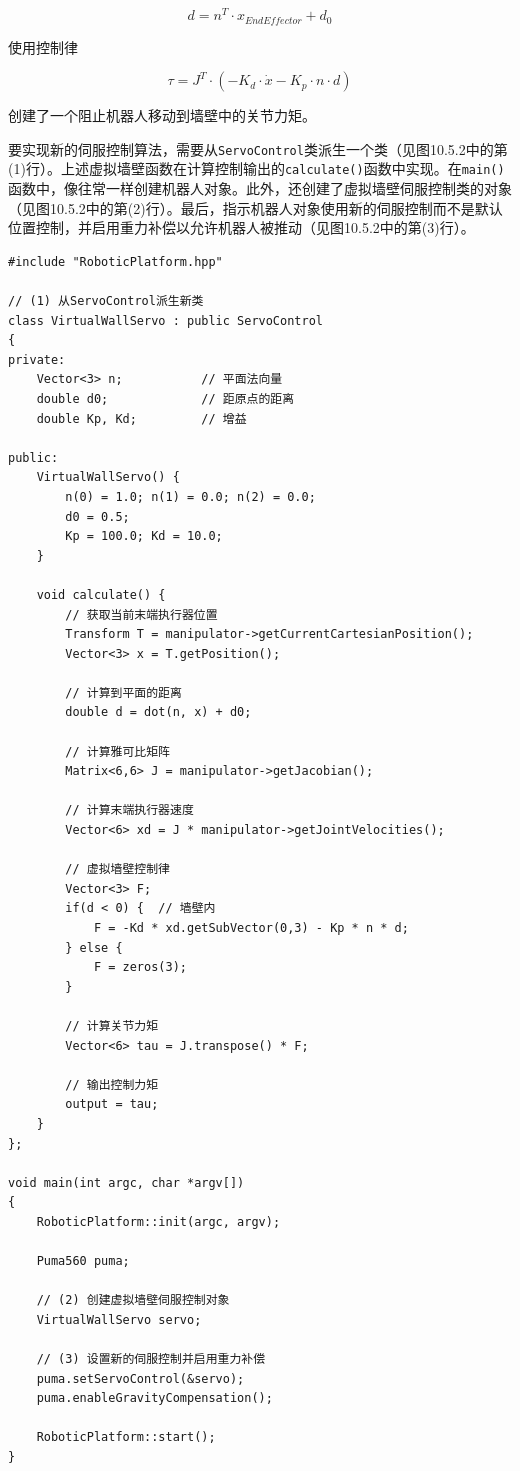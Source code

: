 \documentclass[UTF8,a4paper,12pt]{ctexart}
\begin{document}
\begin{equation}
d = n^T \cdot x_{EndEffector} + d_0
\end{equation}

使用控制律

\begin{equation}
\tau = J^T \cdot (-K_d \cdot \dot{x} - K_p \cdot n \cdot d)
\end{equation}

创建了一个阻止机器人移动到墙壁中的关节力矩。

要实现新的伺服控制算法，需要从\texttt{ServoControl}类派生一个类（见图10.5.2中的第(1)行）。上述虚拟墙壁函数在计算控制输出的\texttt{calculate()}函数中实现。在\texttt{main()}函数中，像往常一样创建机器人对象。此外，还创建了虚拟墙壁伺服控制类的对象（见图10.5.2中的第(2)行）。最后，指示机器人对象使用新的伺服控制而不是默认位置控制，并启用重力补偿以允许机器人被推动（见图10.5.2中的第(3)行）。

\begin{lstlisting}[caption={虚拟墙壁示例},label={lst:virtual-walls}]
#include "RoboticPlatform.hpp"

// (1) 从ServoControl派生新类
class VirtualWallServo : public ServoControl
{
private:
    Vector<3> n;           // 平面法向量
    double d0;             // 距原点的距离
    double Kp, Kd;         // 增益

public:
    VirtualWallServo() {
        n(0) = 1.0; n(1) = 0.0; n(2) = 0.0;
        d0 = 0.5;
        Kp = 100.0; Kd = 10.0;
    }

    void calculate() {
        // 获取当前末端执行器位置
        Transform T = manipulator->getCurrentCartesianPosition();
        Vector<3> x = T.getPosition();

        // 计算到平面的距离
        double d = dot(n, x) + d0;

        // 计算雅可比矩阵
        Matrix<6,6> J = manipulator->getJacobian();

        // 计算末端执行器速度
        Vector<6> xd = J * manipulator->getJointVelocities();

        // 虚拟墙壁控制律
        Vector<3> F;
        if(d < 0) {  // 墙壁内
            F = -Kd * xd.getSubVector(0,3) - Kp * n * d;
        } else {
            F = zeros(3);
        }

        // 计算关节力矩
        Vector<6> tau = J.transpose() * F;

        // 输出控制力矩
        output = tau;
    }
};

void main(int argc, char *argv[])
{
    RoboticPlatform::init(argc, argv);

    Puma560 puma;

    // (2) 创建虚拟墙壁伺服控制对象
    VirtualWallServo servo;

    // (3) 设置新的伺服控制并启用重力补偿
    puma.setServoControl(&servo);
    puma.enableGravityCompensation();

    RoboticPlatform::start();
}
\end{lstlisting}
\end{document}
